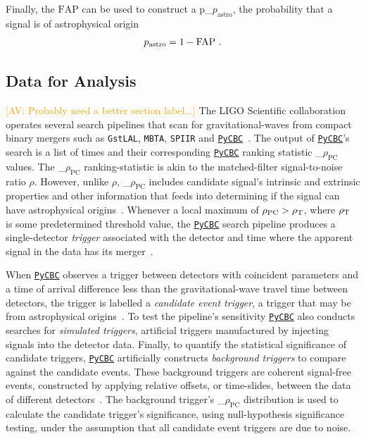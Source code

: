 \documentclass[%
 nofootinbib,
 amsmath,amssymb,
 aps,
 twocolumn
]{revtex4-2}
\newcommand{\pycbc}{{\sc \href{https://pycbc.org/}{\texttt{PyCBC}}}\xspace}
\newcommand{\fancytext}[1]{{\relax\ifmmode#1\else $#1$\fi}\xspace}
\newcommand{\mathcmd}[1]{{\sc \relax\ifmmode#1\else $#1$\fi}\xspace}
\newcommand{\pycbcstat}{\mathcmd{\rho_\text{PC}}}
\newcommand{\snr}{\mathcmd{\rho}}
\newcommand{\fap}{\mathcmd{\text{FAP}}}
\newcommand{\pastro}{\fancytext{p_\text{astro}}}
\newcommand{\avi}[1]{\textcolor{orange}{[AV: #1]}}
\begin{document}
Finally, the \fap can be used to construct a \pastro, the probability that a signal is of astrophysical origin~\cite{pastro_1,pastro_2,pastro_3}
\begin{equation}
    \pastro = 1 -  \fap \ .
\end{equation}


\subsection{Data for Analysis}
\avi{Probably need a better section label...}
The LIGO Scientific collaboration operates several search pipelines that scan for gravitational-waves from compact binary mergers such as \texttt{GstLAL}, \texttt{MBTA}, \texttt{SPIIR} and \pycbc~\cite{GWTC1}. The output of \pycbc's search is a list of times and their corresponding \pycbc ranking statistic \pycbcstat values. The \pycbcstat ranking-statistic is akin to the matched-filter signal-to-noise ratio \snr. However, unlike \snr, \pycbcstat includes candidate signal's intrinsic and extrinsic properties and other information that feeds into determining if the signal can have astrophysical origins~\cite{pycbc_og6}. Whenever a local maximum of $\pycbcstat > \snr_\text{T}$, where $\snr_\text{T}$ is some predetermined threshold value, the \pycbc search pipeline produces a single-detector \textit{trigger} associated with the detector and time where the apparent signal in the data has its merger~\cite{pycbc_og6}.

When \pycbc observes a trigger between detectors with coincident parameters and a time of arrival difference less than the gravitational-wave travel time between detectors, the trigger is labelled a \textit{candidate event trigger}, a trigger that may be from astrophysical origins~\cite{pycbc_og1}. To test the pipeline's sensitivity \pycbc also conducts searches for \textit{simulated triggers}, artificial triggers manufactured by injecting signals into the detector data. Finally, to quantify the statistical significance of candidate triggers, \pycbc artificially constructs \textit{background triggers} to compare against the candidate events. These background triggers are coherent signal-free events, constructed by applying relative offsets, or time-slides, between the data of different detectors~\cite{pycbc_og6}. The background trigger's \pycbcstat distribution is used to calculate the candidate trigger's significance,  using null-hypothesis significance testing, under the assumption that all candidate event triggers are due to noise.
\end{document}
